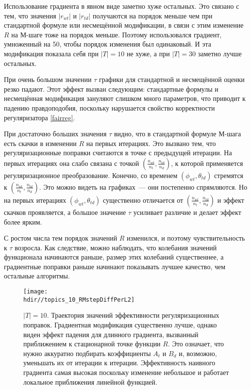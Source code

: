 \documentclass[12pt, twoside]{article}
\newcommand{\hdir}{.}
\begin{document}
Использование градиента в явном виде заметно хуже остальных. Это связано с тем, что значения $|r_{wt}|$ и $|r_{td}|$ получаются на порядок меньше чем при стандартной формуле или несмещённой модификации, в связи с этим изменение $R$ на М-шаге тоже на порядок меньше. Поэтому использовался градиент, умноженный на 50, чтобы порядок изменения был одинаковый. И эта модификация показала себя при $|T| = 10$ не хуже, а при $|T| = 30$ заметно лучше остальных.

При очень большом значении $\tau$ графики для стандартной и несмещённой оценки резко падают. Этот эффект вызван следующим: стандартные формулы и несмещённая модификация зануляют слишком много параметров, что приводит к падению правдоподобия, поскольку нарушается свойство корректности регуляризатора \ref{fairreg}.

При достаточно больших значения $\tau$ видно, что в стандартной  формуле М-шага есть скачки в изменении $R$ на первых итерациях. Это вызвано тем, что регуляризационные поправки считаются в точке с предыдущей итерации. На первых итерациях  она слабо связана с точкой $\left( \frac{n_{wt}}{{n_t}}, \frac{n_{td}}{n_d}\right)$, к которой применяется регуляризационное преобразование. Конечно, со временем $(\phi_{wt}, \theta_{td})$ стремятся к $\left( \frac{n_{wt}}{{n_t}}, \frac{n_{td}}{n_d}\right)$. Это можно видеть на графиках~--- они постепенно спрямляются. Но на первых итерациях $(\phi_{wt}, \theta_{td})$ существенно отличается  от $\left( \frac{n_{wt}}{{n_t}}, \frac{n_{td}}{n_d}\right)$  и эффект скачков  проявляется, а большое значение $\tau$ усиливает различие и делает эффект более ярким.

С ростом числа тем порядок значений $R$ изменился, и поэтому чувствительность к $\tau$ возросла. Как следствие, можно наблюдать, что колебания значений функционала начинаются раньше, размер этих колебаний существеннее, а градиентные поправки раньше начинают показывать лучшее качество, чем остальные алгоритмы.

\begin{figure}[!ht]
	\centering 
	\texttt{[image: \\hdir//topics\_10\_RMstepDiffPerL2]}
	\caption{$|T| = 10$.  Траектория значений эффективности регуляризационных поправок. Градиентная модификация существенно лучше, однако виден эффект падения для длинного градиента, вызванный приближением к стационарной точке функции $R$. Это означает, что нужно аккуратно подбирать коэффициенты $A_t$ и $B_d$ и, возможно, уменьшать их от итерации к итерации. Эффективность наивного градиента самая высокая поскольку изменение небольшое и работает локальное приближения линейной функцией.}   
\end{figure}
\end{document}
